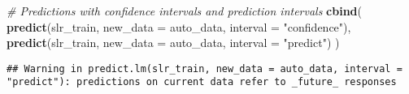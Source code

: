 \documentclass[
]{article}
\newenvironment{Shaded}{\begin{snugshade}}{\end{snugshade}}
\newcommand{\AttributeTok}[1]{\textcolor[rgb]{0.13,0.29,0.53}{#1}}
\newcommand{\CommentTok}[1]{\textcolor[rgb]{0.56,0.35,0.01}{\textit{#1}}}
\newcommand{\FunctionTok}[1]{\textcolor[rgb]{0.13,0.29,0.53}{\textbf{#1}}}
\newcommand{\NormalTok}[1]{#1}
\newcommand{\StringTok}[1]{\textcolor[rgb]{0.31,0.60,0.02}{#1}}
\begin{document}
\begin{Shaded}
\begin{Highlighting}[]
\CommentTok{\# Predictions with confidence intervals and prediction intervals}
\FunctionTok{cbind}\NormalTok{(}
  \FunctionTok{predict}\NormalTok{(slr\_train, }\AttributeTok{new\_data =}\NormalTok{ auto\_data, }\AttributeTok{interval =} \StringTok{"confidence"}\NormalTok{),}
  \FunctionTok{predict}\NormalTok{(slr\_train, }\AttributeTok{new\_data =}\NormalTok{ auto\_data, }\AttributeTok{interval =} \StringTok{"predict"}\NormalTok{)}
\NormalTok{)}
\end{Highlighting}
\end{Shaded}

\begin{verbatim}
## Warning in predict.lm(slr_train, new_data = auto_data, interval = "predict"): predictions on current data refer to _future_ responses
\end{verbatim}
\end{document}
